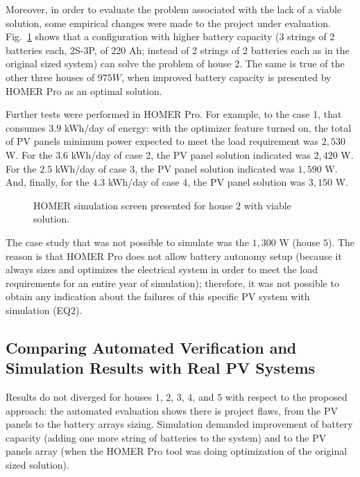 Moreover, in order to evaluate the problem associated with the lack of a viable solution, some empirical changes were made to the  project under evaluation. Fig.~\ref{fig:homersimuh2yes} shows that a configuration with higher battery capacity (3 strings of 2 batteries each, 2S-3P, of 220 Ah; instead of 2 strings of 2 batteries each as in the original sized system) can solve the problem of house 2. The same is true of the other three houses of $975 W$, when improved battery capacity is presented by HOMER Pro as an optimal solution. 

Further tests were performed in HOMER Pro. For example, to the case 1, that consumes $3.9$ kWh/day of energy: with the optimizer feature turned on, the total of PV panels minimum power expected to meet the load requirement was $2,530$ W. For the $3.6$ kWh/day of case 2, the PV panel solution indicated was $2,420$ W. For the $2.5$ kWh/day of case 3, the PV panel solution indicated was $1,590$ W. And, finally, for the $4.3$ kWh/day of case 4, the PV panel solution was $3,150$ W.

\begin{figure}[h]
\centering
\caption{HOMER simulation screen presented for house 2 with viable solution.}
\label{fig:homersimuh2yes}
\end{figure}

The case study that was not possible to simulate was the $1,300$ W (house $5$). The reason is that HOMER Pro does not allow battery autonomy setup (because it always sizes and optimizes the electrical system in order to meet the load requirements for an entire year of simulation); therefore, it was not possible to obtain any indication about the failures of this specific PV system with simulation (EQ2).  

\subsection{Comparing Automated Verification and Simulation Results with Real PV Systems}

Results do not diverged for houses $1$, $2$, $3$, $4$, and $5$ with respect to the proposed approach: the automated evaluation shows there is project flaws, from the PV panels to the battery arrays sizing. Simulation demanded improvement of battery capacity (adding one more string of batteries to the system) and to the PV panels array (when the HOMER Pro tool was doing optimization of the original sized solution). 


